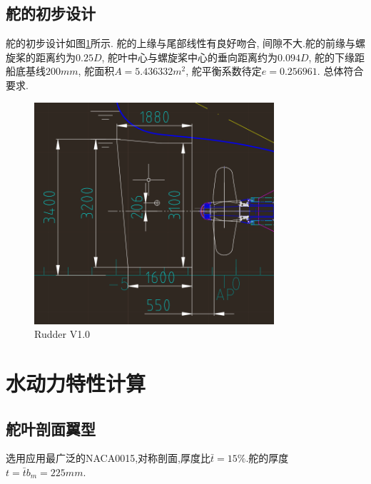\documentclass[a4paper,UTF8]{article}
\begin{document}
\subsection{舵的初步设计}
舵的初步设计如图\ref{fig:r1}所示. 舵的上缘与尾部线性有良好吻合, 间隙不大.舵的前缘与螺旋桨的距离约为$0.25D$, 舵叶中心与螺旋桨中心的垂向距离约为$0.094D$, 舵的下缘距船底基线$200mm$, 舵面积$A=5.436332 m^{2}$, 舵平衡系数待定$e=0.256961$. 总体符合要求.
\begin{figure}
	\centering
	\includegraphics[width=3.5in]{figure/RUDDER-V1}
	\caption{Rudder V1.0}
	\label{fig:r1}
\end{figure}

\section{水动力特性计算}
\subsection{舵叶剖面翼型}
选用应用最广泛的NACA0015,对称剖面,厚度比$\bar{t}=15\%$.舵的厚度$t=\bar{t}b_{m}=225mm$.
\end{document}
